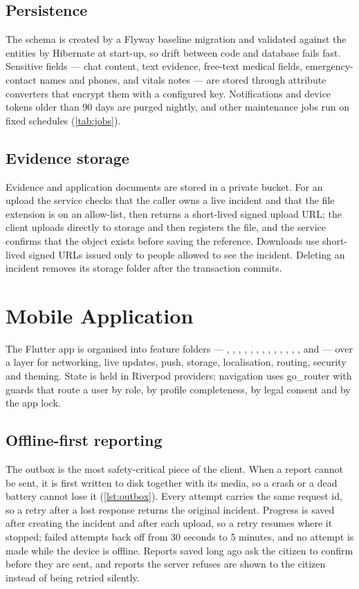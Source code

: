 \subsection{Persistence}
The schema is created by a Flyway baseline migration and validated against the entities by Hibernate at start-up, so
drift between code and database fails fast. Sensitive fields --- chat content, text evidence, free-text medical
fields, emergency-contact names and phones, and vitals notes --- are stored through attribute converters that encrypt
them with a configured key. Notifications and device tokens older than 90 days are purged nightly, and other
maintenance jobs run on fixed schedules (\cref{tab:jobs}).

\subsection{Evidence storage}
Evidence and application documents are stored in a private bucket. For an upload the service checks that the caller
owns a live incident and that the file extension is on an allow-list, then returns a short-lived signed upload URL;
the client uploads directly to storage and then registers the file, and the service confirms that the object exists
before saving the reference. Downloads use short-lived signed URLs issued only to people allowed to see the incident.
Deleting an incident removes its storage folder after the transaction commits.

\section{Mobile Application}

The Flutter app is organised into feature folders --- , , , ,
, , , , , , ,
, ,  and  --- over a  layer for networking, live
updates, push, storage, localisation, routing, security and theming. State is held in Riverpod providers; navigation uses
go\_router with guards that route a user by role, by profile completeness, by legal consent and by the app lock.

\subsection{Offline-first reporting}
The outbox is the most safety-critical piece of the client. When a report cannot be sent, it is first written to disk
together with its media, so a crash or a dead battery cannot lose it (\cref{lst:outbox}). Every attempt carries the same
request id, so a retry after a lost response returns the original incident. Progress is saved after creating the incident
and after each upload, so a retry resumes where it stopped; failed attempts back off from 30 seconds to 5 minutes, and
no attempt is made while the device is offline. Reports saved long ago ask the citizen to confirm before they are sent, and
reports the server refuses are shown to the citizen instead of being retried silently.

